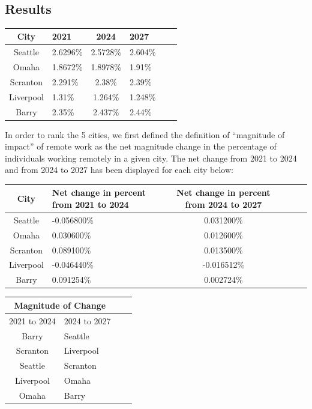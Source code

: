 \documentclass{article}
\begin{document}
\

\subsection{Results}
\begin{table}[ht]
\centering
\begin{tabularx}{200pt}{|c|X|c|X|c|X|}
\hline
    City & 2021 & 2024 & 2027 \\ \hline
    Seattle & 2.6296\% & 2.5728\% & 2.604\% \\ \hline
    Omaha & 1.8672\% & 1.8978\% & 1.91\% \\ \hline
    Scranton & 2.291\% & 2.38\% & 2.39\% \\ \hline
    Liverpool & 1.31\%  & 1.264\% & 1.248\% \\ \hline
    Barry & 2.35\% & 2.437\% & 2.44\% \\ \hline
\end{tabularx}
\end{table}
In order to rank the 5 cities, we first defined the definition of “magnitude of impact” of remote work as the net magnitude change in the percentage of individuals working remotely in a given city. The net change from 2021 to 2024 and from 2024 to 2027 has been displayed for each city below:
\begin{table}[ht]
\centering
\begin{tabularx}{\linewidth}{|c|X|c|X|c|X|}
\hline
    City & Net change in percent from 2021 to 2024 & Net change in percent from 2024 to 2027 \\ \hline
    Seattle & -0.056800\% & 0.031200\%  \\ \hline
    Omaha & 0.030600\% & 0.012600\%  \\ \hline
    Scranton & 0.089100\% & 0.013500\%  \\ \hline
    Liverpool & -0.046440\%  & -0.016512\% \\ \hline
    Barry & 0.091254\% & 0.002724\%  \\ \hline
\end{tabularx}
\end{table}
\begin{table}[ht]
\centering
\begin{tabularx}{135pt}{|c|X|c|X|}
\hline
    \multicolumn{2}{|c|}{\textbf{Magnitude of Change}} \\ \hline
    2021 to 2024 & 2024 to 2027\\ \hline
    Barry & Seattle  \\ \hline
    Scranton & Liverpool  \\ \hline
    Seattle & Scranton  \\ \hline
    Liverpool & Omaha \\ \hline
    Omaha & Barry  \\ \hline
\end{tabularx}
\end{table}
\
\end{document}
